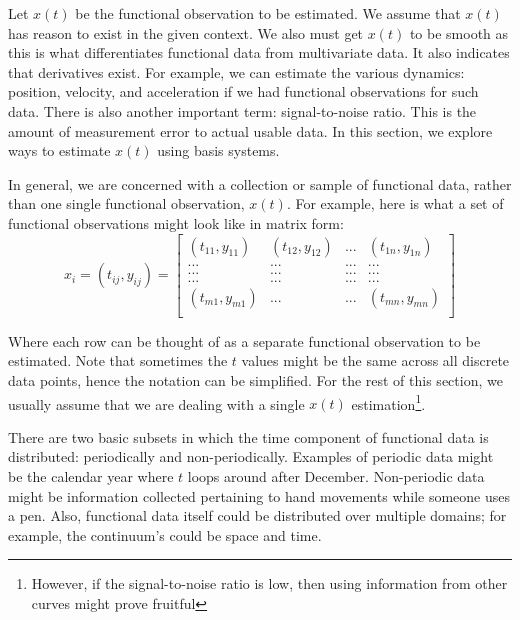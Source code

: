 \documentclass{article}
\begin{document}
\noindent Let $x(t)$ be the functional observation to be estimated. We assume that $x(t)$ has reason to exist in the given context. We also must get $x(t)$ to be smooth as this is what differentiates functional data from multivariate data. It also indicates that derivatives exist. For example, we can estimate the various dynamics: position, velocity, and acceleration if we had functional observations for such data. There is also another important term: signal-to-noise ratio. This is the amount of measurement error to actual usable data. In this section, we explore ways to estimate $x(t)$ using basis systems. 

\noindent In general, we are concerned with a collection or sample of functional data, rather than one single functional observation, $x(t)$. For example, here is what a set of functional observations might look like in matrix form:
\[ x_i = (t_{ij}, y_{ij}) = 
\begin{bmatrix}
    (t_{11}, y_{11}) & (t_{12}, y_{12}) & ... & (t_{1n}, y_{1n}) \\
    ... & ... & ... & ... \\
    ... & ... & ... & ... \\
    ... & ... & ... & ... \\
    (t_{m1}, y_{m1}) & ... & ... & (t_{mn}, y_{mn}) \\
\end{bmatrix}
\]

\noindent Where each row can be thought of as a separate functional observation to be estimated. Note that sometimes the $t$ values might be the same across all discrete data points, hence the notation can be simplified. For the rest of this section, we usually assume that we are dealing with a single $x(t)$ estimation\footnote{However, if the signal-to-noise ratio is low, then using information from other curves might prove fruitful}. 

\noindent There are two basic subsets in which the time component of functional data is distributed: periodically and non-periodically. Examples of periodic data might be the calendar year where $t$ loops around after December. Non-periodic data might be information collected pertaining to hand movements while someone uses a pen. Also, functional data itself could be distributed over multiple domains; for example, the continuum's could be space and time. 
\end{document}
